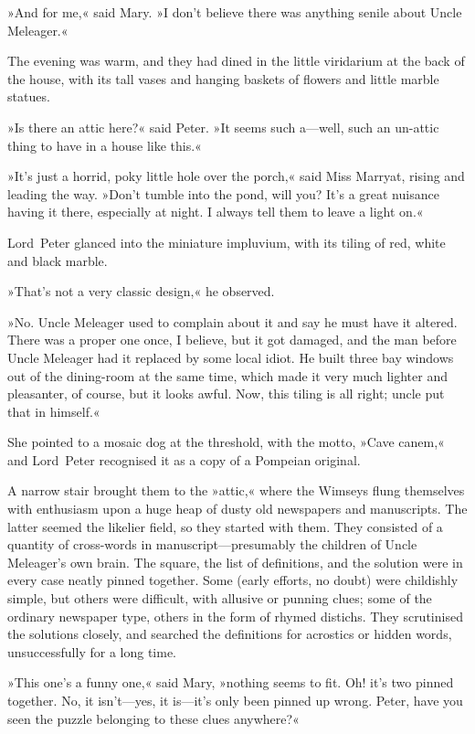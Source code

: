 »And for me,« said Mary. »I don't believe there was anything senile about Uncle Meleager.«

The evening was warm, and they had dined in the little viridarium at the back of the house, with its tall vases and hanging baskets of flowers and little marble statues.

»Is there an attic here?« said Peter. »It seems such a—well, such an un-attic thing to have in a house like this.«

»It's just a horrid, poky little hole over the porch,« said Miss Marryat, rising and leading the way. »Don't tumble into the pond, will you? It's a great nuisance having it there, especially at night. I always tell them to leave a light on.«

Lord~Peter glanced into the miniature impluvium, with its tiling of red, white and black marble.

»That's not a very classic design,« he observed.

»No. Uncle Meleager used to complain about it and say he must have it altered. There was a proper one once, I believe, but it got damaged, and the man before Uncle Meleager had it replaced by some local idiot. He built three bay windows out of the dining-room at the same time, which made it very much lighter and pleasanter, of course, but it looks awful. Now, this tiling is all right; uncle put that in himself.«

She pointed to a mosaic dog at the threshold, with the motto, »Cave canem,« and Lord~Peter recognised it as a copy of a Pompeian original.

A narrow stair brought them to the »attic,« where the Wimseys flung themselves with enthusiasm upon a huge heap of dusty old newspapers and manuscripts. The latter seemed the likelier field, so they started with them. They consisted of a quantity of cross-words in manuscript—presumably the children of Uncle Meleager's own brain. The square, the list of definitions, and the solution were in every case neatly pinned together. Some (early efforts, no doubt) were childishly simple, but others were difficult, with allusive or punning clues; some of the ordinary newspaper type, others in the form of rhymed distichs. They scrutinised the solutions closely, and searched the definitions for acrostics or hidden words, unsuccessfully for a long time.

»This one's a funny one,« said Mary, »nothing seems to fit. Oh! it's two pinned together. No, it isn't—yes, it is—it's only been pinned up wrong. Peter, have you seen the puzzle belonging to these clues anywhere?«

